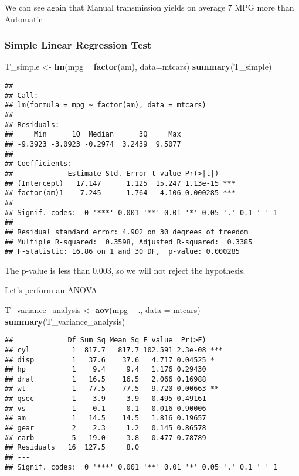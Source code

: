 \documentclass[
]{article}
\newenvironment{Shaded}{\begin{snugshade}}{\end{snugshade}}
\newcommand{\DataTypeTok}[1]{\textcolor[rgb]{0.13,0.29,0.53}{#1}}
\newcommand{\KeywordTok}[1]{\textcolor[rgb]{0.13,0.29,0.53}{\textbf{#1}}}
\newcommand{\NormalTok}[1]{#1}
\newcommand{\OperatorTok}[1]{\textcolor[rgb]{0.81,0.36,0.00}{\textbf{#1}}}
\newcommand{\StringTok}[1]{\textcolor[rgb]{0.31,0.60,0.02}{#1}}
\begin{document}
We can see again that Manual transmission yields on average 7 MPG more
than Automatic

\hypertarget{simple-linear-regression-test}{%
\subsubsection{Simple Linear Regression
Test}\label{simple-linear-regression-test}}

\begin{Shaded}
\begin{Highlighting}[]
\NormalTok{T_simple <-}\StringTok{ }\KeywordTok{lm}\NormalTok{(mpg }\OperatorTok{~}\StringTok{ }\KeywordTok{factor}\NormalTok{(am), }\DataTypeTok{data=}\NormalTok{mtcars)}
\KeywordTok{summary}\NormalTok{(T_simple)}
\end{Highlighting}
\end{Shaded}

\begin{verbatim}
## 
## Call:
## lm(formula = mpg ~ factor(am), data = mtcars)
## 
## Residuals:
##     Min      1Q  Median      3Q     Max 
## -9.3923 -3.0923 -0.2974  3.2439  9.5077 
## 
## Coefficients:
##             Estimate Std. Error t value Pr(>|t|)    
## (Intercept)   17.147      1.125  15.247 1.13e-15 ***
## factor(am)1    7.245      1.764   4.106 0.000285 ***
## ---
## Signif. codes:  0 '***' 0.001 '**' 0.01 '*' 0.05 '.' 0.1 ' ' 1
## 
## Residual standard error: 4.902 on 30 degrees of freedom
## Multiple R-squared:  0.3598, Adjusted R-squared:  0.3385 
## F-statistic: 16.86 on 1 and 30 DF,  p-value: 0.000285
\end{verbatim}

The p-value is less than 0.003, so we will not reject the hypothesis.

Let's perform an ANOVA

\begin{Shaded}
\begin{Highlighting}[]
\NormalTok{T_variance_analysis <-}\StringTok{ }\KeywordTok{aov}\NormalTok{(mpg }\OperatorTok{~}\StringTok{ }\NormalTok{., }\DataTypeTok{data =}\NormalTok{ mtcars)}
\KeywordTok{summary}\NormalTok{(T_variance_analysis)}
\end{Highlighting}
\end{Shaded}

\begin{verbatim}
##             Df Sum Sq Mean Sq F value  Pr(>F)    
## cyl          1  817.7   817.7 102.591 2.3e-08 ***
## disp         1   37.6    37.6   4.717 0.04525 *  
## hp           1    9.4     9.4   1.176 0.29430    
## drat         1   16.5    16.5   2.066 0.16988    
## wt           1   77.5    77.5   9.720 0.00663 ** 
## qsec         1    3.9     3.9   0.495 0.49161    
## vs           1    0.1     0.1   0.016 0.90006    
## am           1   14.5    14.5   1.816 0.19657    
## gear         2    2.3     1.2   0.145 0.86578    
## carb         5   19.0     3.8   0.477 0.78789    
## Residuals   16  127.5     8.0                    
## ---
## Signif. codes:  0 '***' 0.001 '**' 0.01 '*' 0.05 '.' 0.1 ' ' 1
\end{verbatim}
\end{document}
